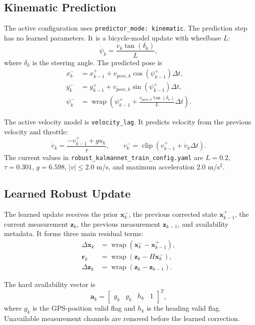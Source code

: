 \documentclass[11pt,a4paper]{article}
\newcommand{\state}{\bm{x}}
\newcommand{\meas}{\bm{z}}
\newcommand{\prior}{\state_k^-}
\newcommand{\avail}{\bm{a}}
\newcommand{\innov}{\bm{r}}
\newcommand{\wrap}{\operatorname{wrap}}
\begin{document}
\subsection{Kinematic Prediction}

The active configuration uses \texttt{predictor\_mode: kinematic}. The
prediction step has no learned parameters. It is a bicycle-model update with
wheelbase $L$:
\begin{equation}
  \dot{\psi}_k =
  \frac{v_k\tan(\delta_k)}{L},
\end{equation}
where $\delta_k$ is the steering angle. The predicted pose is
\begin{align}
  x_k^- &= x_{k-1}^+ + v_{pose,k}\cos(\psi_{k-1}^+)\Delta t, \\
  y_k^- &= y_{k-1}^+ + v_{pose,k}\sin(\psi_{k-1}^+)\Delta t, \\
  \psi_k^- &=
  \wrap\left(\psi_{k-1}^+
  + \frac{v_{pose,k}\tan(\delta_k)}{L}\Delta t\right).
\end{align}

The active velocity model is \texttt{velocity\_lag}. It predicts velocity from
the previous velocity and throttle:
\begin{equation}
  \dot{v}_k =
  \frac{-v_{k-1}^+ + g u_k}{\tau},
  \qquad
  v_k^- =
  \operatorname{clip}\left(v_{k-1}^+ + \dot{v}_k\Delta t\right).
\end{equation}
The current values in \texttt{robust\_kalmannet\_train\_config.yaml} are
$L=0.2$, $\tau=0.301$, $g=6.598$, $|v|\leq2.0$ m/s, and maximum acceleration
$2.0$ m/s$^2$.

\subsection{Learned Robust Update}

The learned update receives the prior $\prior$, the previous corrected state
$\state_{k-1}^+$, the current measurement $\meas_k$, the previous measurement
$\meas_{k-1}$, and availability metadata. It forms three main residual terms:
\begin{align}
  \Delta \state_k &= \wrap(\state_k^- - \state_{k-1}^{+}), \\
  \innov_k &= \wrap(\meas_k - H\state_k^-), \\
  \Delta \meas_k &= \wrap(\meas_k - \meas_{k-1}).
\end{align}

The hard availability vector is
\begin{equation}
  \avail_k =
  \begin{bmatrix}
    g_k & g_k & h_k & 1
  \end{bmatrix}^{T},
\end{equation}
where $g_k$ is the GPS-position valid flag and $h_k$ is the heading valid flag.
Unavailable measurement channels are removed before the learned correction.
\end{document}
